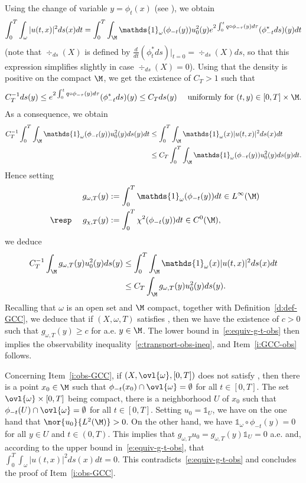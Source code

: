 Using the change of variable $y=\phi_t(x)$ (see \eg \cite[Prop.\,16.42 p432]{Lee:book}), we obtain
\begin{align*}
\int_0^T\int_\omega |u(t,x)|^2 ds(x)dt
= \int_0^T\int_\M \mathds{1}_\omega(\phi_{-t}(y)) u_0^2(y)e^{2\int_0^tq \circ\phi_{-\tau}(y)d\tau} (\phi_{-t}^*ds)(y)dt
\end{align*}
(note that $\div_{ds}(X)$ is defined by $\frac{d}{dt} (\phi_{t}^*ds)|_{t=0} = \div_{ds}(X) ds$, so that this expression simplifies slightly in case $\div_{ds}(X)=0$).
Using that the density is positive on the compact $\M$, we get the existence of $C_T>1$ such that
\[
C_T^{-1} ds(y) \leq e^{2\int_0^tq \circ\phi_{-\tau}(y)d\tau} (\phi_{-t}^*ds)(y) \leq C_T ds(y) \quad \text{ uniformly for } (t,y) \in [0,T]\times \M.
\]
As a consequence, we obtain
\begin{align*}
C_T^{-1} \int_0^T\int_\M \mathds{1}_\omega(\phi_{-t}(y)) u_0^2(y) ds(y)dt
& \leq \int_0^T\int_\M \mathds{1}_\omega(x) |u(t,x)|^2 ds(x)dt \\
& \leq C_T \int_0^T\int_\M \mathds{1}_\omega(\phi_{-t}(y)) u_0^2(y) ds(y)dt.
\end{align*}
Hence setting
\begin{align*}
g_{\omega,T}(y) &:= \int_0^T \mathds{1}_\omega(\phi_{-t}(y)) dt \in L^\infty(\M) \\
\text{ \resp } \quad g_{\chi,T}(y) &:= \int_0^T \chi^2 (\phi_{-t}(y)) dt \in C^0(\M),
\end{align*}
we deduce
\begin{align}
\label{e:equiv-g-t-obs}
C_T^{-1} \int_\M g_{\omega,T}(y) u_0^2(y) ds(y)
& \leq \int_0^T\int_{\M} \mathds{1}_\omega(x) |u(t,x)|^2 ds(x)dt \nonumber \\
& \leq C_T \int_\M g_{\omega,T}(y) u_0^2(y) ds(y).
\end{align}
Recalling that $\omega$ is an open set and $\M$ compact, together with Definition~\ref{d:def-GCC}, we deduce that if $(X,\omega,T)$ satisfies \pGCC, then we have the existence of $c>0$ such that $g_{\omega,T}(y)\geq c$ for a.e. $y\in\M$. The lower bound in~\eqref{e:equiv-g-t-obs} then implies the observability inequality~\eqref{e:transport-obs-ineq}, and Item~\eqref{i:GCC-obs} follows.

Concerning Item~\eqref{i:obs-GCC}, if $(X,\ovl{\omega},[0,T])$ does not satisfy \pGCC, then there is a point $x_0\in \M$ such that $\phi_{-t}(x_0) \cap \ovl{\omega} = \emptyset$ for all $t\in [0,T]$. The set $\ovl{\omega}\times [0,T]$ being compact, there is a neighborhood $U$ of $x_0$ such that $\phi_{-t}(U) \cap \ovl{\omega} = \emptyset$ for all $t\in [0,T]$. Setting $u_0 = \mathds{1}_U$, we have on the one hand that $\nor{u_0}{L^2(\M)} >0$. On the other hand, we have $\mathds{1}_{\omega}\circ \phi_{-t}(y)= 0$ for all $y\in U$ and $t\in (0,T)$. This implies that $g_{\omega,T} u_0 = g_{\omega,T}(y) \mathds{1}_U = 0$ a.e. and, according to the upper bound in~\eqref{e:equiv-g-t-obs}, that $\int_0^T\int_\omega |u(t,x)|^2 ds(x)dt =0$. This contradicts~\eqref{e:equiv-g-t-obs} and concludes the proof of Item~\eqref{i:obs-GCC}.

